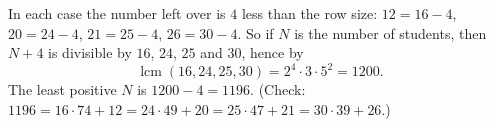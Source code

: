 In each case the number left over is $4$ less than the row size: $12=16-4$, $20=24-4$, $21=25-4$, $26=30-4$. So if $N$ is the number of students, then $N+4$ is divisible by $16$, $24$, $25$ and $30$, hence by
\[\operatorname{lcm}(16,24,25,30)=2^4\cdot3\cdot5^2=1200.\]
The least positive $N$ is $1200-4=\boxed{1196}$. (Check: $1196=16\cdot74+12=24\cdot49+20=25\cdot47+21=30\cdot39+26$.)
